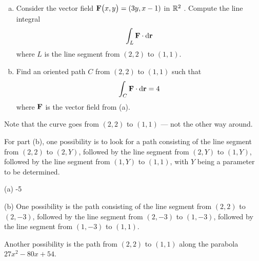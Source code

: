 \begin{question}[M317 2012D]\label{path1} %
	
	\begin{enumerate}[(a)]
		\item
		Consider the vector field $\mathbf{F}\big(x,y\big)= (3y, x-1)$ in $\mathbb{R}^2$ . Compute 
		the line integral
		\begin{equation*}
		\int_L \mathbf{F}\cdot\mathrm{d}\mathbf{r} 
		\end{equation*}
		where $L$ is the line segment from $(2, 2)$ to $(1, 1)$.
		\item
		Find an oriented path $C$ from $(2, 2)$ to $(1, 1)$ such that
		\begin{equation*}
		\int_C \mathbf{F}\cdot\mathrm{d}\mathbf{r} =4
		\end{equation*}
		where $\mathbf{F}$ is the vector field from (a).
	\end{enumerate}
\end{question}

\begin{hint} 
	Note that the curve goes from $(2,2)$ to $(1,1)$ --- not the other way around.
	
	For part (b), one possibility is to look for a path
	consisting of the line segment from $(2,2)$ to $(2,Y)$, followed by 
	the line segment from $(2,Y)$ to $(1,Y)$, followed by the line 
	segment from $(1,Y)$ to $(1,1)$, with $Y$ being a parameter to be determined.
\end{hint}

\begin{answer} 
	(a) -5
	
	(b) One possibility is the path consisting of the line
	segment from $(2,2)$ to $(2,-3)$, followed by the line segment from
	$(2,-3)$ to $(1,-3)$, followed by the line segment from $(1,-3)$ to $(1,1)$.
	
	Another possibility is the path from $(2,2)$ to $(1,1)$ along the parabola $27x^2-80x+54$.
\end{answer}

